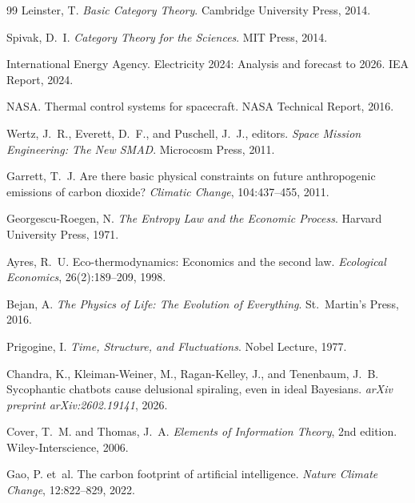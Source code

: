\documentclass[11pt,a4paper]{article}
\theoremstyle{plain}
\theoremstyle{definition}
\theoremstyle{remark}
\begin{document}
\begin{thebibliography}{99}
Leinster, T.
\newblock \emph{Basic Category Theory}.
\newblock Cambridge University Press, 2014.

Spivak, D.~I.
\newblock \emph{Category Theory for the Sciences}.
\newblock MIT Press, 2014.

International Energy Agency.
\newblock Electricity 2024: Analysis and forecast to 2026.
\newblock IEA Report, 2024.

NASA\@.
\newblock Thermal control systems for spacecraft.
\newblock NASA Technical Report, 2016.

Wertz, J.~R., Everett, D.~F., and Puschell, J.~J., editors.
\newblock \emph{Space Mission Engineering: The New SMAD}.
\newblock Microcosm Press, 2011.

Garrett, T.~J.
\newblock Are there basic physical constraints on future anthropogenic emissions
  of carbon dioxide?
\newblock \emph{Climatic Change}, 104:437--455, 2011.

Georgescu-Roegen, N.
\newblock \emph{The Entropy Law and the Economic Process}.
\newblock Harvard University Press, 1971.

Ayres, R.~U.
\newblock Eco-thermodynamics: Economics and the second law.
\newblock \emph{Ecological Economics}, 26(2):189--209, 1998.

Bejan, A.
\newblock \emph{The Physics of Life: The Evolution of Everything}.
\newblock St.\ Martin's Press, 2016.

Prigogine, I.
\newblock \emph{Time, Structure, and Fluctuations}.
\newblock Nobel Lecture, 1977.

Chandra, K., Kleiman-Weiner, M., Ragan-Kelley, J., and Tenenbaum, J.~B.
\newblock Sycophantic chatbots cause delusional spiraling, even in ideal
  Bayesians.
\newblock \emph{arXiv preprint arXiv:2602.19141}, 2026.

Cover, T.~M. and Thomas, J.~A.
\newblock \emph{Elements of Information Theory}, 2nd edition.
\newblock Wiley-Interscience, 2006.

Gao, P. et~al.
\newblock The carbon footprint of artificial intelligence.
\newblock \emph{Nature Climate Change}, 12:822--829, 2022.


\end{thebibliography}
\end{document}
